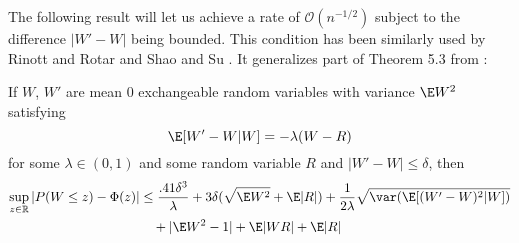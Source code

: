 The following result will let us achieve a rate of $\mathcal{O}(n^{-1/2})$ subject to
the difference $|W'-W|$ being bounded.  This condition has been similarly used by
Rinott and Rotar \cite{rinott1997coupling} and Shao and Su \cite{shao2006berry}.
It generalizes part of Theorem 5.3 from \cite{chen2010normal}:
\begin{theorem}
  \label{T:better-rate}
  If $W$, $W'$ are mean 0 exchangeable random variables with variance
  $\E W^2$
  satisfying
  \begin{equation*}
    \E[W'-W|W] = -\lambda(W-R)
  \end{equation*}
  for some $\lambda \in (0,1)$ and some random variable $R$ and $|W'-W| \leq \delta$, then
  \begin{equation*}
    \begin{split}
      \sup_{z \in \mathbb{R}} |P(W \leq z) - \Phi(z)|
      &\leq \frac{.41 \delta^3}{\lambda} + 3 \delta (\sqrt{\E W^2} + \E |R|)
      + \frac{1}{2\lambda} \sqrt{\var (\E [(W'-W)^2|W])} \\
      &\quad + |\E W^2 - 1| + \E |WR| + \E |R|
    \end{split}
  \end{equation*}
\end{theorem}
